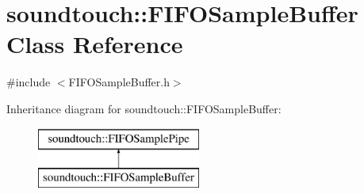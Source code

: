 \hypertarget{classsoundtouch_1_1_f_i_f_o_sample_buffer}{}\section{soundtouch\+:\+:F\+I\+F\+O\+Sample\+Buffer Class Reference}
\label{classsoundtouch_1_1_f_i_f_o_sample_buffer}


{\ttfamily \#include $<$F\+I\+F\+O\+Sample\+Buffer.\+h$>$}

Inheritance diagram for soundtouch\+:\+:F\+I\+F\+O\+Sample\+Buffer\+:\begin{figure}[H]
\begin{center}
\leavevmode
\includegraphics[height=2.000000cm]{classsoundtouch_1_1_f_i_f_o_sample_buffer}
\end{center}
\end{figure}
